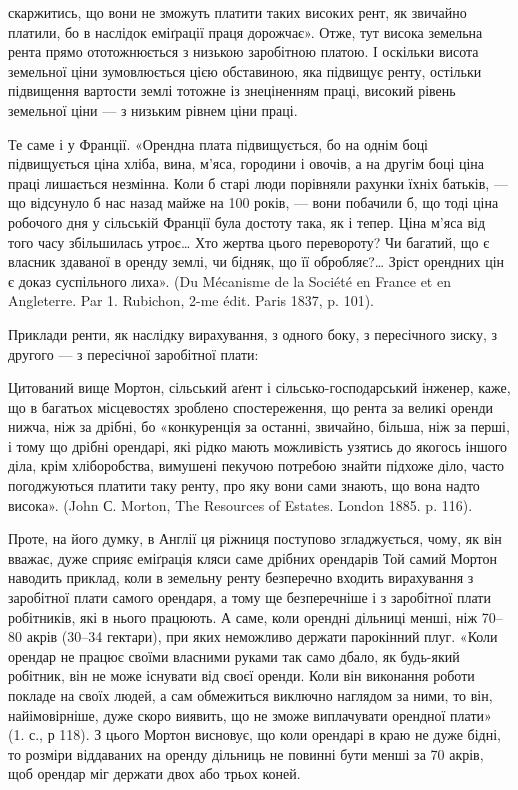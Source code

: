 \parcont{}  %
скаржитись, що вони не зможуть платити таких високих рент, як звичайно
платили, бо в наслідок еміґрації праця дорожчає». Отже, тут висока земельна
рента прямо ототожнюється з низькою заробітною платою. І оскільки висота
земельної ціни зумовлюється цією обставиною, яка підвищує ренту, остільки підвищення
вартости землі тотожне із знеціненням праці, високий рівень земельної
ціни — з низьким рівнем ціни праці.

Те саме і у Франції. «Орендна плата підвищується, бо на однім боці підвищується
ціна хліба, вина, м’яса, городини і овочів, а на другім боці ціна
праці лишається незмінна. Коли б старі люди порівняли рахунки їхніх батьків, —
що відсунуло б нас назад майже на 100 років, — вони побачили б, що тоді ціна
робочого дня у сільській Франції була достоту така, як і тепер. Ціна м’яса від того
часу збільшилась утроє\dots{} Хто жертва цього перевороту? Чи багатий, що є власник
здаваної в оренду землі, чи бідняк, що її обробляє?\dots{} Зріст орендних
цін є доказ суспільного лиха». (Du Mécanisme de la Société en France et en
Angleterre. Par 1. Rubichon, 2-me édit. Paris 1837, p. 101).

Приклади ренти, як наслідку вирахування, з одного боку, з пересічного
зиску, з другого — з пересічної заробітної плати:

Цитований вище Мортон, сільський аґент і сільсько-господарський інженер,
каже, що в багатьох місцевостях зроблено спостереження, що рента
за великі оренди нижча, ніж за дрібні, бо «конкуренція за останні, звичайно,
більша, ніж за перші, і тому що дрібні орендарі, які рідко мають можливість
узятись до якогось іншого діла, крім хліборобства, вимушені пекучою потребою
знайти підхоже діло, часто погоджуються платити таку ренту, про яку вони
сами знають, що вона надто висока». (John С. Morton, The Resources of Estates.
London 1885. p. 116).

Проте, на його думку, в Англії ця ріжниця поступово згладжується, чому,
як він вважає, дуже сприяє еміґрація кляси саме дрібних орендарів Той самий
Мортон наводить приклад, коли в земельну ренту безперечно входить вирахування
з заробітної плати самого орендаря, а тому ще безперечніше і з заробітної
плати робітників, які в нього працюють. А саме, коли орендні дільниці
менші, ніж 70--80 акрів (30--34 гектари), при яких неможливо держати парокінний
плуг. «Коли орендар не працює своїми власними руками так само
дбало, як будь-який робітник, він не може існувати від своєї оренди. Коли він
виконання роботи покладе на своїх людей, а сам обмежиться виключно наглядом
за ними, то він, найімовірніше, дуже скоро виявить, що не зможе виплачувати
орендної плати» (1. с., р 118). З цього Мортон висновує, що коли орендарі
в краю не дуже бідні, то розміри віддаваних на оренду дільниць не повинні
бути менші за 70 акрів, щоб орендар міг держати двох або трьох коней.

